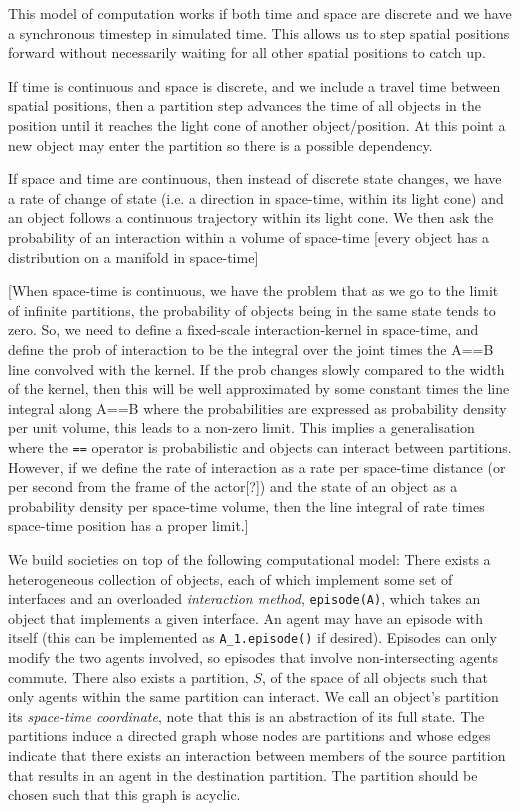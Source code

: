 \documentclass[a4paper]{article}
\begin{document}
This model of computation works if both time and space are discrete and we have a synchronous timestep in simulated time. This allows us to step spatial positions forward without necessarily waiting for all other spatial positions to catch up.

If time is continuous and space is discrete, and we include a travel time between spatial positions, then a partition step advances the time of all objects in the position until it reaches the light cone of another object/position. At this point a new object may enter the partition so there is a possible dependency.

If space and time are continuous, then instead of discrete state changes, we have a rate of change of state (i.e. a direction in space-time, within its light cone) and an object follows a continuous trajectory within its light cone. We then ask the probability of an interaction within a volume of space-time [every object has a distribution on a manifold in space-time]

[When space-time is continuous, we have the problem that as we go to the limit of infinite partitions, the probability of objects being in the same state tends to zero. So, we need to define a fixed-scale interaction-kernel in space-time, and define the prob of interaction to be the integral over the joint times the A==B line convolved with the kernel. If the prob changes slowly compared to the width of the kernel, then this will be well approximated by some constant times the line integral along A==B where the probabilities are expressed as probability density per unit volume, this leads to a non-zero limit. This implies a generalisation where the \texttt{==} operator is probabilistic and objects can interact between partitions. However, if we define the rate of interaction as a rate per space-time distance (or per second from the frame of the actor[?]) and the state of an object as a probability density per space-time volume, then the line integral of rate times space-time position has a proper limit.]


We build societies on top of the following computational model: There exists a heterogeneous collection of objects, each of which implement some set of interfaces and an overloaded \textit{interaction method}, \texttt{episode(A)}, which takes an object that implements a given interface. An agent may have an episode with itself (this can be implemented as \texttt{A_1.episode()} if desired). Episodes can only modify the two agents involved, so episodes that involve non-intersecting agents commute. There also exists a partition, $S$, of the space of all objects such that only agents within the same partition can interact. We call an object's partition its \textit{space-time coordinate}, note that this is an abstraction of its full state. The partitions induce a directed graph whose nodes are partitions and whose edges indicate that there exists an interaction between members of the source partition that results in an agent in the destination partition. The partition should be chosen such that this graph is acyclic. 
\end{document}
